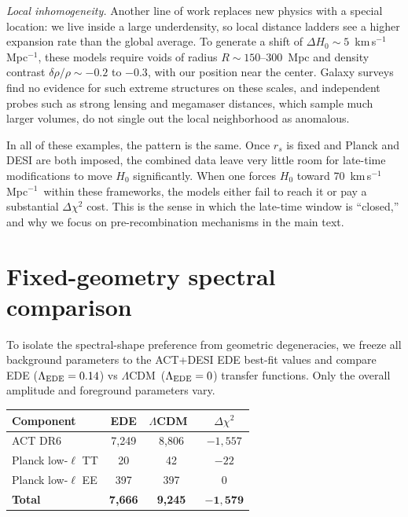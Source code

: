 \documentclass[twocolumn,showpacs,preprintnumbers,amsmath,amssymb,prd]{revtex4-2}
\newcommand{\lcdm}{$\Lambda$CDM}
\newcommand{\kms}{km\,s$^{-1}$\,Mpc$^{-1}$}
\begin{document}
\emph{Local inhomogeneity.} Another line of work replaces new physics with a 
special location: we live inside a large underdensity, so local distance ladders 
see a higher expansion rate than the global average. To generate a shift of 
$\Delta H_0 \sim 5$~\kms, these models require voids of radius 
$R \sim 150$--300~Mpc and density contrast $\delta\rho/\rho \sim -0.2$ to $-0.3$, 
with our position near the center. Galaxy surveys find no evidence for such extreme 
structures on these scales, and independent probes such as strong lensing and 
megamaser distances, which sample much larger volumes, do not single out the local 
neighborhood as anomalous.

In all of these examples, the pattern is the same. Once $r_s$ is fixed and Planck 
and DESI are both imposed, the combined data leave very little room for late-time 
modifications to move $H_0$ significantly. When one forces $H_0$ toward 
70~\kms\ within these frameworks, the models either fail to 
reach it or pay a substantial $\Delta\chi^2$ cost. This is the sense in which the 
late-time window is ``closed,'' and why we focus on pre-recombination mechanisms in 
the main text.

\section{Fixed-geometry spectral comparison}
\label{app:fixedgeom}

To isolate the spectral-shape preference from geometric degeneracies, we freeze 
all background parameters to the ACT+DESI EDE best-fit values and compare 
EDE ($\Lambda_{\rm EDE} = 0.14$) vs \lcdm\ ($\Lambda_{\rm EDE} = 0$) transfer 
functions. Only the overall amplitude and foreground parameters vary.

\begin{center}
\begin{tabular}{lccc}
\toprule
Component & EDE & \lcdm\ & $\Delta\chi^2$ \\
\midrule
ACT DR6 & 7{,}249 & 8{,}806 & $-1{,}557$ \\
Planck low-$\ell$ TT & 20 & 42 & $-22$ \\
Planck low-$\ell$ EE & 397 & 397 & $0$ \\
\midrule
\textbf{Total} & \textbf{7{,}666} & \textbf{9{,}245} & $\mathbf{-1{,}579}$ \\
\bottomrule
\end{tabular}
\end{center}
\end{document}
